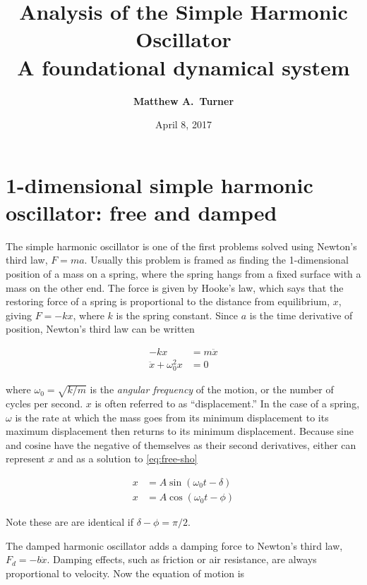 \documentclass[10pt,letterpaper]{article}
\title{Analysis of the Simple Harmonic Oscillator \\ 
    {\small A foundational dynamical system}
}
\author{{\bf Matthew A.~Turner}}
\date{April 8, 2017}
\begin{document}
\maketitle

\section{1-dimensional simple harmonic oscillator: free and damped}
\label{sec:1d}

The simple harmonic oscillator is one of the first problems solved using
Newton's third law, $F=ma$. Usually this problem is framed as finding the
1-dimensional position of a mass on a spring, where the spring hangs from
a fixed surface with a mass on the other end.
The force is given by Hooke's law, which says that the restoring force 
of a spring is proportional to the distance from equilibrium, $x$, giving
$F = -k x$, where $k$ is the spring constant. Since $a$ is the time derivative
of position, Newton's third law can be written

\begin{align*}
    -k x &= m \ddot{x} \\
    \ddot{x} + \omega_0^2 x &= 0
    \label{eq:free-sho}
\end{align*}

\noindent
where $\omega_0 = \sqrt{k/m}$ is the \textit{angular frequency} of the motion,
or the number of cycles per second. $x$ is often referred to as ``displacement.''
In the case of a spring, $\omega$ is the 
rate at which the mass goes from its minimum displacement to its maximum 
displacement then returns to its minimum displacement. Because
sine and cosine have the negative of themselves as their second derivatives,
either can represent $x$ and as a solution to \ref{eq:free-sho}

\begin{subequations}
    \begin{align}
        x & = A \sin(\omega_0 t - \delta) \\
        x & = A \cos(\omega_0 t - \phi)
    \end{align}
\end{subequations}

\noindent
Note these are are identical if $\delta - \phi = \pi / 2$. 

The damped harmonic oscillator adds a damping force to Newton's third law,
$F_d = -b \dot{x}$. Damping effects, such as friction or air resistance,
are always proportional to velocity. Now the equation of motion is
\end{document}
